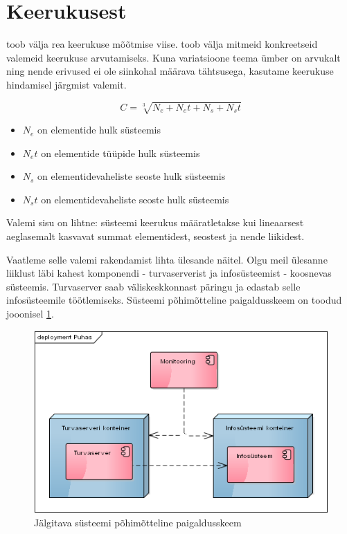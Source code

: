 \documentclass{tufte-book}
\begin{document}
\section{Keerukusest}
\label{sec:complexity}
\cite{mitchell2009complexity} toob välja rea keerukuse mõõtmise viise. \citeauthor{crawley2015systems}\cite{crawley2015systems} toob välja mitmeid konkreetseid valemeid keerukuse arvutamiseks. Kuna variatsioone teema ümber on arvukalt ning nende erivused ei ole siinkohal määrava tähtsusega, kasutame keerukuse hindamisel järgmist valemit. 

\begin{equation}
	C = \sqrt[3]{N_e + N_et + N_s + N_st}
	\label{eq:complexity}
\end{equation}

\begin{itemize}
	\item $N_e$ on elementide hulk süsteemis
	\item $N_et$ on elementide tüüpide hulk süsteemis
	\item $N_s$ on elementidevaheliste seoste hulk süsteemis
	\item $N_st$ on elementidevaheliste seoste hulk süsteemis
\end{itemize}

Valemi sisu on lihtne: süsteemi keerukus määratletakse kui lineaarsest aeglasemalt kasvavat summat elementidest, seostest ja nende liikidest. 

Vaatleme selle valemi rakendamist lihta ülesande näitel. Olgu meil ülesanne liiklust läbi kahest komponendi - turvaserverist ja infosüsteemist - koosnevas süsteemis. Turvaserver saab väliskeskkonnast päringu ja edastab selle infosüsteemile töötlemiseks. Süsteemi põhimõtteline paigaldusskeem on toodud jooonisel \ref{fig:complexity:pure}.

\begin{figure}[htp]
	\begin{center}
		\includegraphics[width=.7\textwidth]{puhas.png}
		\caption{Jälgitava süsteemi põhimõtteline paigaldusskeem}
		\label{fig:complexity:pure}
	\end{center}
\end{figure}
\end{document}
